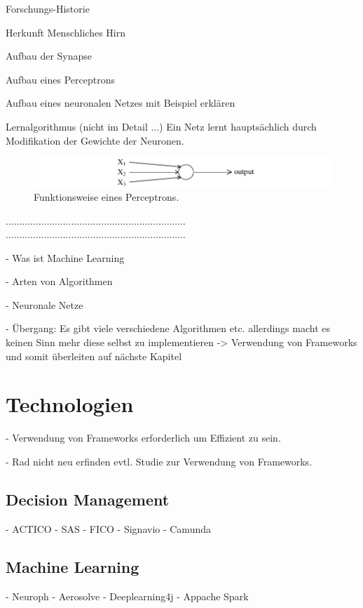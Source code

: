Forschungs-Historie

Herkunft Menschliches Hirn  

Aufbau der Synapse

Aufbau eines Perceptrons 

Aufbau eines neuronalen Netzes mit Beispiel erklären 

Lernalgorithmus (nicht im Detail ...)
Ein Netz lernt hauptsächlich durch Modifikation der Gewichte der Neuronen.


\begin{figure}[ht]
\centering
\includegraphics{images/perceptron.pdf}
\caption{Funktionsweise eines Perceptrons.}
\label{fig:perceptron}
\end{figure}



..................................................................
..................................................................

- Was ist Machine Learning

- Arten von Algorithmen 

- Neuronale Netze 

- Übergang: Es gibt viele verschiedene Algorithmen etc. allerdings macht es keinen Sinn mehr diese selbst zu implementieren -> Verwendung von Frameworks und somit überleiten auf nächste Kapitel

\section{Technologien}
\label{sec:Technologien2}

- Verwendung von Frameworks erforderlich um Effizient zu sein.

- Rad nicht neu erfinden evtl. Studie zur Verwendung von Frameworks.

\subsection{Decision Management}
\label{subsec:Decision_Management2}

- ACTICO 
- SAS
- FICO 
- Signavio
- Camunda

\subsection{Machine Learning}
\label{subsec:Machine_Learning2}

- Neuroph
- Aerosolve 
- Deeplearning4j
- Appache Spark

